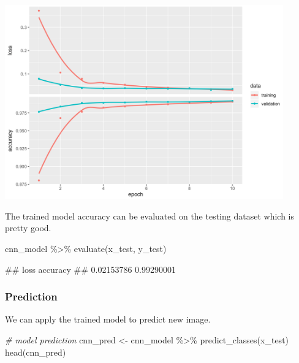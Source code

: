 \documentclass[
  12pt,
]{krantz}
\makeatletter
\newenvironment{Shaded}{\begin{snugshade}}{\end{snugshade}}
\newcommand{\CommentTok}[1]{\textcolor[rgb]{0.37,0.37,0.37}{\textit{#1}}}
\newcommand{\FunctionTok}[1]{\textcolor[rgb]{0,0,0}{#1}}
\newcommand{\NormalTok}[1]{#1}
\newcommand{\OtherTok}[1]{\textcolor[rgb]{0.37,0.37,0.37}{#1}}
\newcommand{\SpecialCharTok}[1]{\textcolor[rgb]{0,0,0}{#1}}
\newenvironment{kframe}{%
\medskip{}
\setlength{\fboxsep}{.8em}
 \def\at@end@of@kframe{}%
 \ifinner\ifhmode%
  \def\at@end@of@kframe{\end{minipage}}%
  \begin{minipage}{\columnwidth}%
 \fi\fi%
 \def\FrameCommand##1{\hskip\@totalleftmargin \hskip-\fboxsep
 \colorbox{shadecolor}{##1}\hskip-\fboxsep
     \hskip-\linewidth \hskip-\@totalleftmargin \hskip\columnwidth}%
 \MakeFramed {\advance\hsize-\width
   \@totalleftmargin\z@ \linewidth\hsize
   \@setminipage}}%
 {\par\unskip\endMakeFramed%
 \at@end@of@kframe}
\renewenvironment{Shaded}{\begin{kframe}}{\end{kframe}}
\makeatother
\begin{document}
\includegraphics[width=0.9\textwidth,height=\textheight]{images/cnn_history.png}

The trained model accuracy can be evaluated on the testing dataset which is pretty good.

\begin{Shaded}
\begin{Highlighting}[]
\NormalTok{cnn\_model }\SpecialCharTok{\%\textgreater{}\%} \FunctionTok{evaluate}\NormalTok{(x\_test, y\_test)}
\end{Highlighting}
\end{Shaded}

\begin{Shaded}
\begin{Highlighting}[]
\NormalTok{\#\#       loss   accuracy }
\NormalTok{\#\# 0.02153786 0.99290001}
\end{Highlighting}
\end{Shaded}

\hypertarget{prediction-1}{%
\subsubsection{Prediction}\label{prediction-1}}

We can apply the trained model to predict new image.

\begin{Shaded}
\begin{Highlighting}[]
\CommentTok{\# model prediction}
\NormalTok{cnn\_pred }\OtherTok{\textless{}{-}}\NormalTok{ cnn\_model }\SpecialCharTok{\%\textgreater{}\%} 
              \FunctionTok{predict\_classes}\NormalTok{(x\_test)}
\FunctionTok{head}\NormalTok{(cnn\_pred)}
\end{Highlighting}
\end{Shaded}
\end{document}
